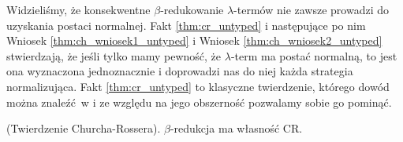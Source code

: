 Widzieliśmy, że konsekwentne \(\beta\)-redukowanie \(\lambda\)-termów nie zawsze prowadzi do uzyskania postaci normalnej. Fakt \ref{thm:cr_untyped} i następujące po nim Wniosek \ref{thm:ch_wniosek1_untyped} i Wniosek \ref{thm:ch_wniosek2_untyped} stwierdzają, że jeśli tylko mamy pewność, że \(\lambda\)-term ma postać normalną, to jest ona wyznaczona jednoznacznie i doprowadzi nas do niej każda strategia normalizująca. Fakt \ref{thm:cr_untyped} to klasyczne twierdzenie, którego dowód można znaleźć w \cite[Rozdział 3.2]{Barendregt_1984} i ze względu na jego obszerność pozwalamy sobie go pominąć. 

\begin{fakt}(Twierdzenie Churcha-Rossera)\label{thm:cr_untyped}. 
\(\beta\)-redukcja ma własność CR. 
\end{fakt}


